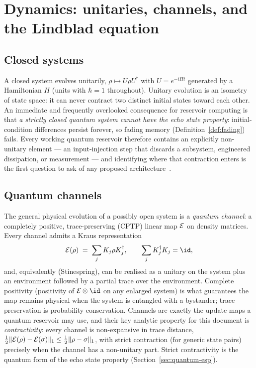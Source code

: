 \section{Dynamics: unitaries, channels, and the Lindblad equation}
\label{sec:channels}

\subsection{Closed systems}

A closed system evolves unitarily, $\rho \mapsto U \rho U^\dagger$ with
$U = e^{-iHt}$ generated by a Hamiltonian $H$ (units with $\hbar = 1$
throughout). Unitary evolution is an isometry of state space: it can never
contract two distinct initial states toward each other. An immediate and
frequently overlooked consequence for reservoir computing is that
\emph{a strictly closed quantum system cannot have the echo state property}:
initial-condition differences persist forever, so fading memory
(Definition~\ref{def:fading}) fails. Every working quantum reservoir therefore
contains an explicitly non-unitary element --- an input-injection step that
discards a subsystem, engineered dissipation, or measurement --- and identifying
where that contraction enters is the first question to ask of any proposed
architecture~\citep{chen2019learning,sannia2024dissipation,kobayashi2024coherence}.

\subsection{Quantum channels}

The general physical evolution of a possibly open system is a
\emph{quantum channel}: a completely positive, trace-preserving (CPTP) linear
map $\mathcal{E}$ on density matrices. Every channel admits a Kraus representation
\begin{equation}
  \map{E}(\rho) \;=\; \sum_j K_j \rho K_j^\dagger,
  \qquad
  \sum_j K_j^\dagger K_j = \id ,
  \label{eq:kraus}
\end{equation}
and, equivalently (Stinespring), can be realised as a unitary on the system
plus an environment followed by a partial trace over the environment.
Complete positivity (positivity of $\map{E}\otimes\id$ on any enlarged system)
is what guarantees the map remains physical when the system is entangled with
a bystander; trace preservation is probability conservation. Channels are
exactly the update maps a quantum reservoir may use, and their key analytic
property for this document is \emph{contractivity}: every channel is
non-expansive in trace distance,
$\tfrac12\lVert\mathcal{E}(\rho)-\mathcal{E}(\sigma)\rVert_1 \le
 \tfrac12\lVert\rho-\sigma\rVert_1$,
with strict contraction (for generic state pairs) precisely when the channel
has a non-unitary part. Strict contractivity is the quantum form of the echo
state property (Section~\ref{sec:quantum-esp}).

